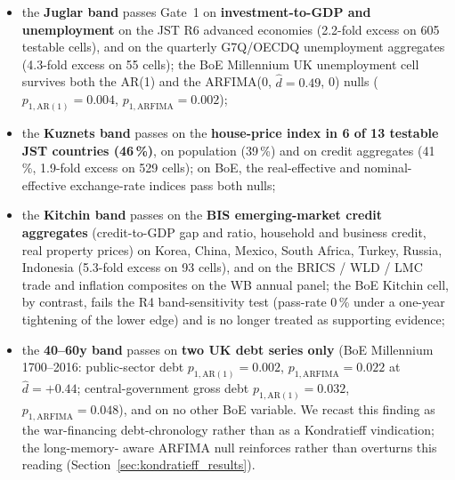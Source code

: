 \begin{itemize}
\item the \textbf{Juglar band} passes Gate~1 on
  \textbf{investment-to-GDP and unemployment} on the JST R6
  advanced economies (2.2-fold excess on 605 testable cells),
  and on the quarterly G7Q/OECDQ unemployment aggregates
  (4.3-fold excess on 55 cells); the BoE Millennium UK
  unemployment cell survives both the AR(1) and the
  ARFIMA(0, \(\hat d=0.49\), 0) nulls
  (\(p_{1,\mathrm{AR(1)}}=0.004\),
  \(p_{1,\mathrm{ARFIMA}}=0.002\));
\item the \textbf{Kuznets band} passes on the
  \textbf{house-price index in 6 of 13 testable JST countries
  (46\,\%)}, on population (39\,\%) and on credit aggregates
  (41\,\%, 1.9-fold excess on 529 cells); on BoE, the
  real-effective and nominal-effective exchange-rate indices
  pass both nulls;
\item the \textbf{Kitchin band} passes on the \textbf{BIS
  emerging-market credit aggregates} (credit-to-GDP gap and
  ratio, household and business credit, real property prices) on
  Korea, China, Mexico, South Africa, Turkey, Russia, Indonesia
  (5.3-fold excess on 93 cells), and on the BRICS / WLD / LMC
  trade and inflation composites on the WB annual panel; the
  BoE Kitchin cell, by contrast, fails the R4 band-sensitivity
  test (pass-rate 0\,\% under a one-year tightening of the
  lower edge) and is no longer treated as supporting evidence;
\item the \textbf{40--60y band} passes on \textbf{two UK debt
  series only} (BoE Millennium 1700--2016: public-sector debt
  \(p_{1,\mathrm{AR(1)}}=0.002\),
  \(p_{1,\mathrm{ARFIMA}}=0.022\) at \(\hat d=+0.44\);
  central-government gross debt
  \(p_{1,\mathrm{AR(1)}}=0.032\),
  \(p_{1,\mathrm{ARFIMA}}=0.048\)), and on no other BoE
  variable. We recast this finding as the
  \citet{reinhart_rogoff2009} war-financing debt-chronology
  rather than as a Kondratieff vindication; the long-memory-
  aware ARFIMA null reinforces rather than overturns this
  reading (Section~\ref{sec:kondratieff_results}).
\end{itemize}

